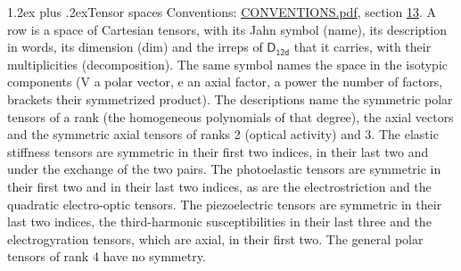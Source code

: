 \documentclass[10pt,a4paper]{article}
\makeatletter
\renewcommand\section{\@startsection{section}{1}{\z@}{-3ex plus -1ex minus -.2ex}%
  {1.2ex plus .2ex}{\normalfont\large\sffamily\bfseries\color{parttitle}}}
\numberwithin{equation}{section}
\newcommand{\grp}[1]{\mathsf{#1}}
\makeatother
\begin{document}
\section{Tensor spaces}\label{s:tensor_spaces}
Conventions: \href{../../CONVENTIONS.pdf}{CONVENTIONS.pdf}, section \href{../../CONVENTIONS.pdf\#conv.13}{13}.
\leavevmode\label{n:head.name}\label{n:head.description}\label{n:head.dim}\label{n:head.decomposition}A row is a space of Cartesian tensors, with its Jahn symbol (name), its description in words, its dimension (dim) and the irreps of $\grp{D_{12d}}$ that it carries, with their multiplicities (decomposition). \label{n:label.jahn}The same symbol names the space in the isotypic components (V a polar vector, e an axial factor, a power the number of factors, brackets their symmetrized product). The descriptions name the symmetric polar tensors of a rank (the homogeneous polynomials of that degree), the axial vectors and the symmetric axial tensors of ranks 2 (optical activity) and 3. The elastic stiffness tensors are symmetric in their first two indices, in their last two and under the exchange of the two pairs. The photoelastic tensors are symmetric in their first two and in their last two indices, as are the electrostriction and the quadratic electro-optic tensors. The piezoelectric tensors are symmetric in their last two indices, the third-harmonic susceptibilities in their last three and the electrogyration tensors, which are axial, in their first two. The general polar tensors of rank 4 have no symmetry.
\end{document}
